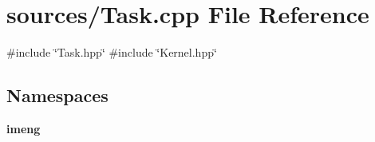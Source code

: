 \section{sources/\+Task.cpp File Reference}
\label{_task_8cpp}
{\ttfamily \#include \char`\"{}Task.\+hpp\char`\"{}}\newline
{\ttfamily \#include \char`\"{}Kernel.\+hpp\char`\"{}}\newline
\subsection*{Namespaces}
\begin{DoxyCompactItemize}
\item 
 \textbf{ imeng}
\end{DoxyCompactItemize}
